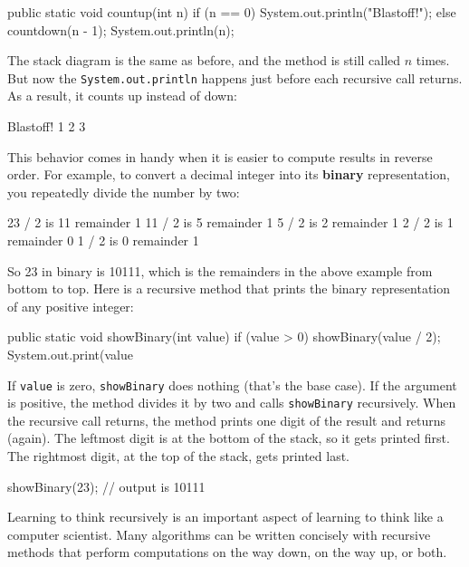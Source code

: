 \documentclass[12pt]{book}
\theoremstyle{exercise}
\newcommand{\java}[1]{\lstinline{#1}} %
\begin{document}
\begin{code}
    public static void countup(int n) {
        if (n == 0) {
            System.out.println("Blastoff!");
        } else {
            countdown(n - 1);
            System.out.println(n);
        }
    }
\end{code}

The stack diagram is the same as before, and the method is still called $n$ times.
But now the \java{System.out.println} happens just before each recursive call returns.
As a result, it counts up instead of down:

\begin{stdout}
Blastoff!
1
2
3
\end{stdout}

This behavior comes in handy when it is easier to compute results in reverse order.
For example, to convert a decimal integer into its {\bf binary} representation, you repeatedly divide the number by two:

\begin{stdout}
23 / 2 is 11 remainder 1
11 / 2 is  5 remainder 1
 5 / 2 is  2 remainder 1
 2 / 2 is  1 remainder 0
 1 / 2 is  0 remainder 1
\end{stdout}

So 23 in binary is 10111, which is the remainders in the above example from bottom to top.
Here is a recursive method that prints the binary representation of any positive integer:

\begin{code}
    public static void showBinary(int value) {
        if (value > 0) {
            showBinary(value / 2);
            System.out.print(value %
        }
    }
\end{code}

If \java{value} is zero, \java{showBinary} does nothing (that's the base case).
If the argument is positive, the method divides it by two and calls \java{showBinary} recursively.
When the recursive call returns, the method prints one digit of the result and returns (again).
The leftmost digit is at the bottom of the stack, so it gets printed first.  The rightmost digit, at the top of the stack, gets printed last.

\begin{code}
    showBinary(23);    
    // output is 10111
\end{code}

Learning to think recursively is an important aspect of learning to think like a computer scientist.
Many algorithms can be written concisely with recursive methods that perform computations on the way down, on the way up, or both.
\end{document}
